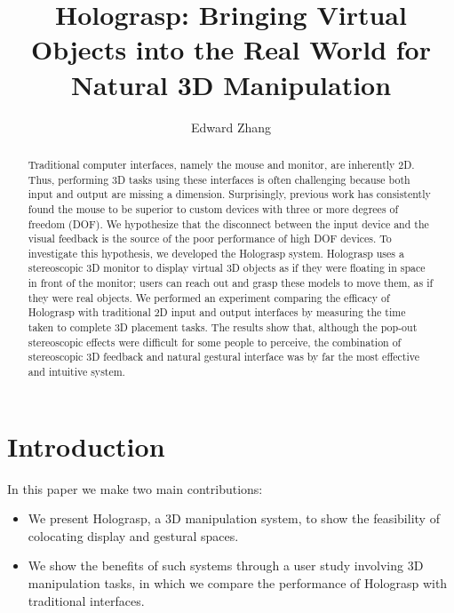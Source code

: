 \documentclass[pageno]{jpaper}
\begin{document}
\title{Holograsp: Bringing Virtual Objects into the Real World for Natural 3D Manipulation}

\date{}
\author{Edward Zhang}
\maketitle
\doublespacing
\thispagestyle{empty}

\begin{abstract}
Traditional computer interfaces, namely the mouse and monitor, are inherently 2D. Thus, performing 3D tasks using
these interfaces is often challenging because both input and output are missing a dimension. Surprisingly,
previous work has consistently found the mouse to be superior to custom devices with three or more degrees
of freedom (DOF). We hypothesize that the disconnect between the input device and the visual feedback is the
source of the poor performance of high DOF devices. To investigate this hypothesis, we developed the Holograsp
system. Holograsp uses a stereoscopic 3D monitor to display virtual 3D objects as if they were floating in
space in front of the monitor; users can reach out and grasp these models to move them, as if they were real
objects. We performed an experiment comparing the efficacy of Holograsp with traditional 2D input and output
interfaces by measuring the time taken to complete 3D placement tasks. The results show that, although the
pop-out stereoscopic effects were difficult for some people to perceive, the combination of stereoscopic 3D
feedback and natural gestural interface was by far the most effective and intuitive system.
\end{abstract}

\newpage
\tableofcontents
\newpage

\section{Introduction}
In this paper we make two main contributions:
\begin{itemize}
\item We present Holograsp, a 3D manipulation system, to show the feasibility of colocating display and gestural spaces.
\item We show the benefits of such systems through a user study involving 3D manipulation tasks, in which we compare the
performance of Holograsp with traditional interfaces.
\end{itemize}

\end{document}
